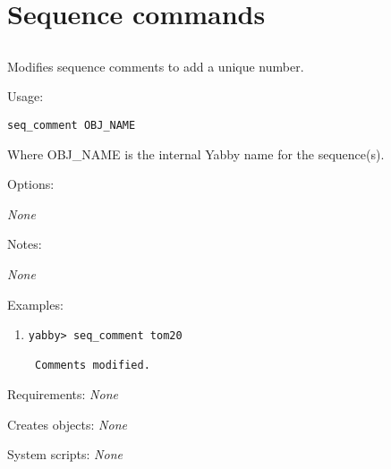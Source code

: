
\section{Sequence commands}


\subsection[seq\_comment]{  }



Modifies sequence comments to add a unique number.


\begin{description}


\item{Usage:}

{\tt seq\_comment OBJ\_NAME}

Where OBJ\_NAME is the internal Yabby name for the sequence(s).


\item{Options:}
\begin{description}
{\em None}
\end{description}


\item{Notes:}
\begin{enumerate}
{\em None}
\end{enumerate}


\item{Examples:}
\begin{enumerate}

\item
\begin{verbatim}
yabby> seq_comment tom20

 Comments modified.

\end{verbatim}

\end{enumerate}


\item{Requirements:} {\em None}


\item{Creates objects:} {\em None}


\item{System scripts:} {\em None}

\end{description}

